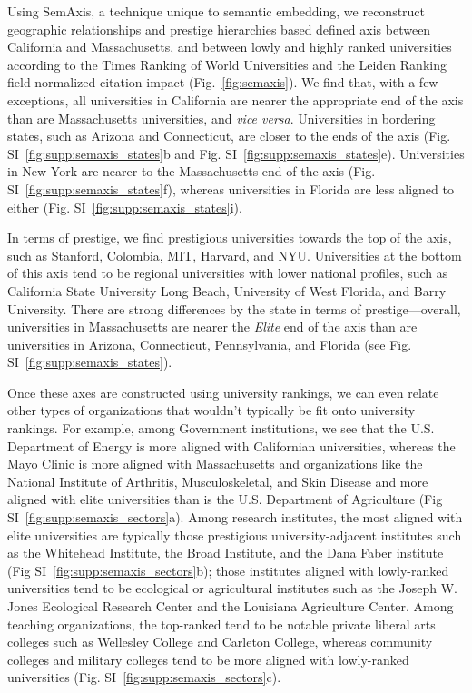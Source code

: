 \documentclass[12pt]{article} %
\begin{document}
Using SemAxis, a technique unique to semantic embedding, we reconstruct geographic relationships and prestige hierarchies based defined axis between California and Massachusetts, and between lowly and highly ranked universities according to the Times Ranking of World Universities and the Leiden Ranking field-normalized citation impact (Fig.~\ref{fig:semaxis}).
We find that, with a few exceptions, all universities in California are nearer the appropriate end of the axis than are Massachusetts universities, and \textit{vice versa}.
Universities in bordering states, such as Arizona and Connecticut, are closer to the ends of the axis (Fig. SI~\ref{fig:supp:semaxis_states}b and Fig. SI~\ref{fig:supp:semaxis_states}e).
Universities in New York are nearer to the Massachusetts end of the axis (Fig. SI~\ref{fig:supp:semaxis_states}f), whereas universities in Florida are less aligned to either (Fig. SI~\ref{fig:supp:semaxis_states}i).

In terms of prestige, we find prestigious universities towards the top of the axis, such as Stanford, Colombia, MIT, Harvard, and NYU.
Universities at the bottom of this axis tend to be regional universities with lower national profiles, such as California State University Long Beach, University of West Florida, and Barry University.
There are strong differences by the state in terms of prestige—overall, universities in Massachusetts are nearer the \textit{Elite} end of the axis than are universities in Arizona, Connecticut, Pennsylvania, and Florida (see Fig. SI~\ref{fig:supp:semaxis_states}).

Once these axes are constructed using university rankings, we can even relate other types of organizations that wouldn't typically be fit onto university rankings.
For example, among Government institutions, we see that the U.S. Department of Energy is more aligned with Californian universities, whereas the Mayo Clinic is more aligned with Massachusetts and organizations like the National Institute of Arthritis, Musculoskeletal, and Skin Disease and more aligned with elite universities than is the U.S. Department of Agriculture (Fig SI~\ref{fig:supp:semaxis_sectors}a).
Among research institutes, the most aligned with elite universities are typically those prestigious university-adjacent institutes such as the Whitehead Institute, the Broad Institute, and the Dana Faber institute (Fig SI~\ref{fig:supp:semaxis_sectors}b); those institutes aligned with lowly-ranked universities tend to be ecological or agricultural institutes such as the Joseph W. Jones Ecological Research Center and the Louisiana Agriculture Center.
Among teaching organizations, the top-ranked tend to be notable private liberal arts colleges such as Wellesley College and Carleton College, whereas community colleges and military colleges tend to be more aligned with lowly-ranked universities (Fig. SI~\ref{fig:supp:semaxis_sectors}c).
\end{document}
